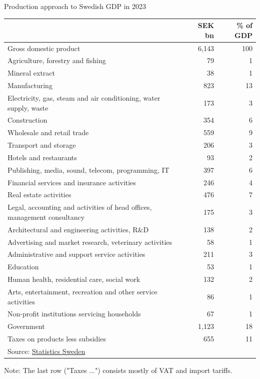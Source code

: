\documentclass[10pt]{beamer}
\begin{document}
\begin{frame}{Production approach to Swedish GDP in 2023}
\tiny{
\begin{table}
    \centering
    \begin{tabular}{lrr}
    & SEK bn & \% of GDP \\
    \hline
     Gross domestic product  & 6,143 & 100 \\
     Agriculture, forestry and fishing & 79 & 1 \\
     Mineral extract & 38 & 1 \\
     Manufacturing & 823 & 13 \\
     Electricity, gas, steam and air conditioning, water supply, waste & 173 & 3 \\
     Construction & 354 & 6 \\
     Wholesale and retail trade & 559 & 9 \\
     Transport and storage & 206 & 3 \\
     Hotels and restaurants & 93 & 2 \\
     Publishing, media, sound, telecom, programming, IT & 397 & 6 \\
     Financial services and insurance activities & 246 & 4 \\
     Real estate activities & 476 & 7 \\
     Legal, accounting and activities of head offices, management consultancy & 175 &  3 \\
     Architectural and engineering activities, R\&D & 138 &  2 \\
     Advertising and market research, veterinary activities & 58 & 1 \\
     Administrative and support service activities & 211 & 3 \\
     Education & 53 & 1 \\
     Human health, residential care, social work & 132 & 2 \\
     Arts, entertainment, recreation and other service activities & 86 & 1 \\
     Non-profit institutions servicing households & 67 & 1 \\
     Government & 1,123 & 18 \\
     Taxes on products less subsidies & 655 & 11 \\
     \hline
     \multicolumn{3}{l}{\tiny{Source: \href{https://www.statistikdatabasen.scb.se/pxweb/en/ssd/START__NR__NR0103__NR0103E/NR0103ENS2010T06NA/}{Statistics Sweden}}}
    \end{tabular}
\end{table}
\medskip
Note: The last row ("Taxes ...") consists mostly of VAT and import tariffs.
}
\end{frame}
\end{document}
